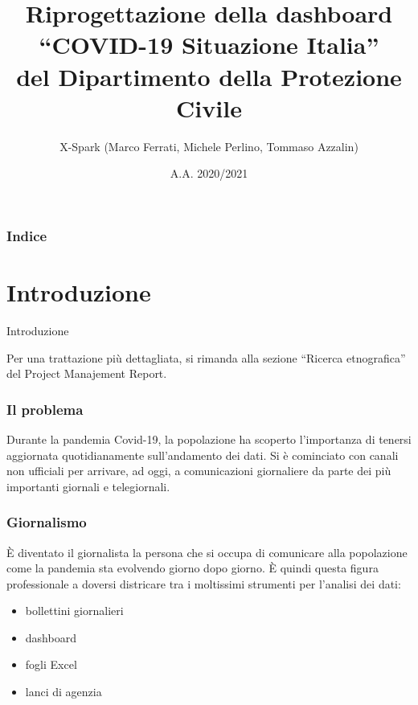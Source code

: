 \documentclass[handout]{beamer}
\title[Riprogettazione della dashboard\\``COVID-19 Situazione Italia'']{Riprogettazione della dashboard\\``COVID-19 Situazione Italia''\\del Dipartimento della Protezione Civile}
\author{X-Spark (Marco Ferrati, Michele Perlino, Tommaso Azzalin)}
\institute[UniBo]{LM Informatica\\
Università di Bologna - Alma Mater Studiorum}
\date{A.A. 2020/2021}
\begin{document}
	\begin{frame}[plain]
	  \titlepage
	\end{frame}
	\begin{frame}
  		\frametitle{Indice}
		\tableofcontents
	\end{frame}
	
	\section{Introduzione}
		\begin{frame}
			\centering
			\begin{Huge}
				Introduzione
			\end{Huge}
			\mbox{}
			\vfill
			\vspace*{100px}
			\begin{tiny}
				Per una trattazione più dettagliata, si rimanda alla sezione ``Ricerca etnografica'' del Project Manajement Report.
			\end{tiny}
		\end{frame}
		\begin{frame}
			\frametitle{Il problema}
			Durante la pandemia Covid-19, la popolazione ha scoperto l'importanza di tenersi aggiornata quotidianamente sull'andamento dei dati.\newline \newline
			Si è cominciato con canali non ufficiali per arrivare, ad oggi, a comunicazioni giornaliere da parte dei più importanti giornali e telegiornali.
		\end{frame}

		\begin{frame}
			\frametitle{Giornalismo}
			\`E diventato il giornalista la persona che si occupa di comunicare alla popolazione come la pandemia sta evolvendo giorno dopo giorno.\newline \newline
			\`E quindi questa figura professionale a doversi districare tra i moltissimi strumenti per l'analisi dei dati:
			\begin{itemize}[<+->]
				\item bollettini giornalieri\\
				\item dashboard\\
				\item fogli Excel\\
				\item lanci di agenzia\\
			\end{itemize}
		\end{frame}
\end{document}
